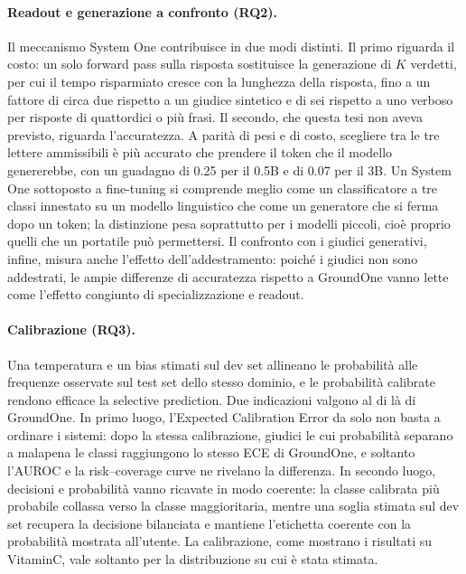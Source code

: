 \paragraph{Readout e generazione a confronto (RQ2).} Il meccanismo System One contribuisce in due modi distinti. Il primo
riguarda il costo: un solo forward pass sulla risposta sostituisce la generazione di $K$ verdetti, per cui il tempo
risparmiato cresce con la lunghezza della risposta, fino a un fattore di circa due rispetto a un giudice sintetico e di sei
rispetto a uno verboso per risposte di quattordici o più frasi. Il secondo, che questa tesi non aveva previsto, riguarda
l'accuratezza. A parità di pesi e di costo, scegliere tra le tre lettere ammissibili è più accurato che prendere il token
che il modello genererebbe, con un guadagno di 0.25 per il 0.5B e di 0.07 per il 3B. Un System One sottoposto a
fine-tuning si comprende meglio come un classificatore a tre classi innestato su un modello linguistico che come un
generatore che si ferma dopo un token; la distinzione pesa soprattutto per i modelli piccoli, cioè proprio quelli che un
portatile può permettersi. Il confronto con i giudici generativi, infine, misura anche l'effetto dell'addestramento:
poiché i giudici non sono addestrati, le ampie differenze di accuratezza rispetto a GroundOne vanno lette come l'effetto
congiunto di specializzazione e readout.

\paragraph{Calibrazione (RQ3).} Una temperatura e un bias stimati sul dev set allineano le probabilità alle frequenze
osservate sul test set dello stesso dominio, e le probabilità calibrate rendono efficace la selective prediction. Due
indicazioni valgono al di là di GroundOne. In primo luogo, l'Expected Calibration Error da solo non basta a ordinare i
sistemi: dopo la stessa calibrazione, giudici le cui probabilità separano a malapena le classi raggiungono lo stesso ECE di
GroundOne, e soltanto l'AUROC e la risk--coverage curve ne rivelano la differenza. In secondo luogo, decisioni e
probabilità vanno ricavate in modo coerente: la classe calibrata più probabile collassa verso la classe maggioritaria,
mentre una soglia stimata sul dev set recupera la decisione bilanciata e mantiene l'etichetta coerente con la probabilità
mostrata all'utente. La calibrazione, come mostrano i risultati su VitaminC, vale soltanto per la distribuzione su cui è
stata stimata.

